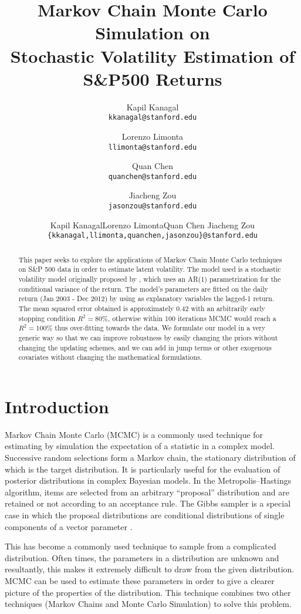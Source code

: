 \documentclass[letterpaper]{article}
\title{Markov Chain Monte Carlo Simulation on\\Stochastic Volatility Estimation of S\&P500 Returns}
\author{
	Kapil Kanagal\\ \texttt{kkanagal@stanford.edu}
	\and
	Lorenzo Limonta\\ \texttt{llimonta@stanford.edu}
	\and	
	Quan Chen\\ \texttt{quanchen@stanford.edu}
	\and
	Jiacheng Zou\\ \texttt{jasonzou@stanford.edu}
}
\author{
	Kapil Kanagal\qquad Lorenzo Limonta\qquad Quan Chen \qquad Jiacheng Zou
	\\\texttt{\{kkanagal,llimonta,quanchen,jasonzou\}@stanford.edu}
}
\begin{document}
	\maketitle
	\tableofcontents
	\newpage
	\begin{abstract}
		This paper seeks to explore the applications of Markov Chain Monte Carlo techniques on  S\&P 500  data in order to estimate latent volatility. The model used is a stochastic volatility model originally proposed by \citet{rossi1994bayesian}, which uses an AR(1) parametrization for the conditional variance of the return. The model's parameters are fitted on the daily return (Jan 2003 - Dec 2012) by using as explanatory variables the lagged-1 return. The mean squared error obtained is approximately 0.42 with an arbitrarily early stopping condition $R^2=80\%$, otherwise within 100 iterations MCMC would reach a $R^2=100\%$ thus over-fitting towards the data. We formulate our model in a very generic way so that we can improve robustness by easily changing the priors without changing the updating schemes, and we can add in jump terms or other exogenous covariates without changing the mathematical formulations.
	\end{abstract}
	\section{Introduction}
	Markov Chain Monte Carlo (MCMC) is a commonly used technique for estimating by simulation the expectation of a statistic in a complex model. Successive random selections form a Markov chain, the stationary distribution of which is the target distribution. It is particularly useful for the evaluation of posterior distributions in complex Bayesian models. In the Metropolis–Hastings algorithm, items are selected from an arbitrary “proposal” distribution and are retained or not according to an acceptance rule. The Gibbs sampler is a special case in which the proposal distributions are conditional distributions of single components of a vector parameter \cite{gilks2005markov}.
	
	This has become a commonly used technique to sample from a complicated distribution. Often times, the parameters in a distribution are unknown and resultantly, this makes it extremely difficult to draw from the given distribution. MCMC can be used to estimate these parameters in order to give a clearer picture of the properties of the distribution. This technique combines two other techniques (Markov Chains and Monte Carlo Simulation) to solve this problem.
	
\end{document}
